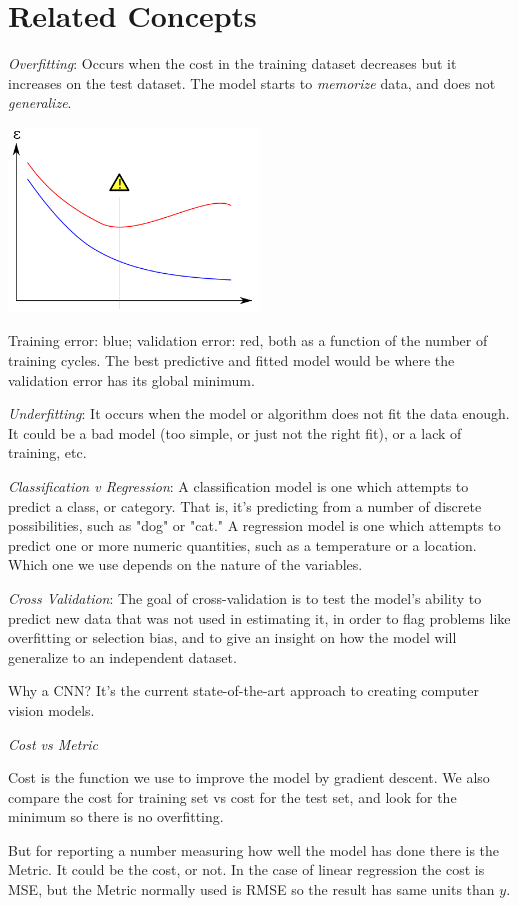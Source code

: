 \section{Related Concepts}
\textit{Overfitting}: Occurs when the cost in the training dataset decreases but it increases on the test dataset. The model starts to \textit{memorize} data, and does not \textit{generalize}.
\begin{center}
\includegraphics[width=0.5\textwidth]{overfitting.png}
\end{center}

Training error: blue; validation error: red, both as a function of the number of training cycles. The best predictive and fitted model would be where the validation error has its global minimum.

\textit{Underfitting}: It occurs when the model or algorithm does not fit the data enough. It could be a bad model (too simple, or just not the right fit), or a lack of training, etc.

\textit{Classification v Regression}: A classification model is one which attempts to predict a class, or category. That is, it's predicting from a number of discrete possibilities, such as "dog" or "cat." A regression model is one which attempts to predict one or more numeric quantities, such as a temperature or a location. Which one we use depends on the nature of the variables.

\textit{Cross Validation}: The goal of cross-validation is to test the model's ability to predict new data that was not used in estimating it, in order to flag problems like overfitting or selection bias, and to give an insight on how the model will generalize to an independent dataset.

Why a CNN? It's the current state-of-the-art approach to creating computer vision models.

\textit{Cost vs Metric}

Cost is the function we use to improve the model by gradient descent. We also compare the cost for training set vs cost for the test set, and look for the minimum so there is no overfitting.

But for reporting a number measuring how well the model has done there is the Metric. It could be the cost, or not. In the case of linear regression the cost is MSE, but the Metric normally used is RMSE so the result has same units than $y$.
